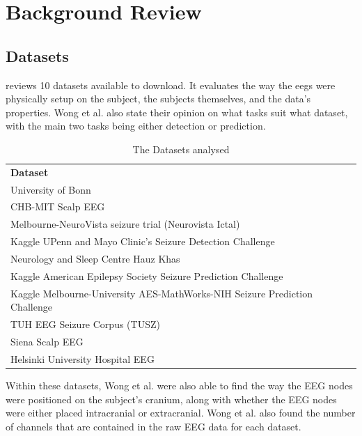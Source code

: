 \documentclass[12pt]{article}
\begin{document}
\section{Background Review}

\subsection{Datasets}\label{datasets}

\cite{wong2023eeg} reviews 10 datasets available to download. It evaluates the way the \acrshort{eegs} were physically setup on the subject, the subjects themselves, and the data's properties. Wong et al. also state their opinion on what tasks suit what dataset, with the main two tasks being either detection or prediction. 

\begin{table}[H]
\centering
\begin{tabular}{l}
\textbf{Dataset}                       \\
University of Bonn                   \\
CHB-MIT Scalp EEG                    \\
Melbourne-NeuroVista seizure trial (Neurovista Ictal)                           \\
Kaggle UPenn and Mayo Clinic's Seizure Detection Challenge                     \\
Neurology and Sleep Centre Hauz Khas \\
Kaggle American Epilepsy Society Seizure Prediction Challenge                  \\
Kaggle Melbourne-University AES-MathWorks-NIH Seizure Prediction Challenge \\
TUH EEG Seizure Corpus (TUSZ)        \\
Siena Scalp EEG                      \\
Helsinki University Hospital EEG    
\end{tabular}
\caption{The Datasets analysed}
\end{table}

Within these datasets, Wong et al. were also able to find the way the EEG nodes were positioned on the subject's cranium, along with whether the EEG nodes were either placed intracranial or extracranial. Wong et al. also found the number of channels that are contained in the raw EEG data for each dataset.
\end{document}
